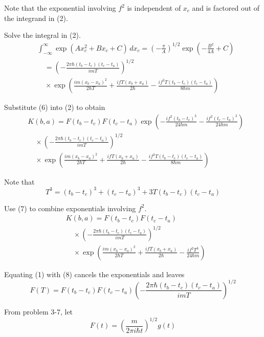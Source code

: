 \documentclass[12pt]{article}
\begin{document}
Note that the exponential involving $f^2$ is independent of $x_c$
and is factored out of the integrand in (2).

\bigskip
Solve the integral in (2).
\begin{align*}
&\int_{-\infty}^{\infty}\exp(Ax_c^2+Bx_c+C)\,dx_c
=\left(-\frac{\pi}{A}\right)^{1/2}
\exp\left(-\frac{B^2}{4A}+C\right)
\\
&\quad{}=\left(-\frac{2\pi\hbar(t_b-t_c)(t_c-t_a)}{imT}\right)^{1/2}
\\
&\quad{}\times\exp\left(
\frac{im(x_b-x_a)^2}{2\hbar T}
+\frac{ifT(x_b+x_a)}{2\hbar}
-\frac{if^2T(t_b-t_c)(t_c-t_a)}{8\hbar m}
\right)
\tag{6}
\end{align*}

Substitute (6) into (2) to obtain
\begin{align*}
&K(b,a)=F(t_b-t_c)F(t_c-t_a)
\exp\left(-\frac{if^2(t_b-t_c)^3}{24\hbar m}-\frac{if^2(t_c-t_a)^3}{24\hbar m}\right)
\\
&\quad{}\times
\left(-\frac{2\pi\hbar(t_b-t_c)(t_c-t_a)}{imT}\right)^{1/2}
\\
&\quad{}\times
\exp\left(
\frac{im(x_b-x_a)^2}{2\hbar T}
+\frac{ifT(x_b+x_a)}{2\hbar}
-\frac{if^2T(t_b-t_c)(t_c-t_a)}{8\hbar m}
\right)
\end{align*}

Note that
\begin{equation*}
T^3=(t_b-t_c)^3+(t_c-t_a)^3+3T(t_b-t_c)(t_c-t_a)
\tag{7}
\end{equation*}

Use (7) to combine exponentials involving $f^2$.
\begin{align*}
&K(b,a)=F(t_b-t_c)F(t_c-t_a)
\\
&\quad{}\times
\left(-\frac{2\pi\hbar(t_b-t_c)(t_c-t_a)}{imT}\right)^{1/2}
\\
&\quad{}\times
\exp\left(
\frac{im(x_b-x_a)^2}{2\hbar T}
+\frac{ifT(x_b+x_a)}{2\hbar}
-\frac{if^2T^3}{24\hbar m}
\right)
\tag{8}
\end{align*}

Equating (1) with (8) cancels the exponentials and leaves
\begin{equation*}
F(T)=F(t_b-t_c)F(t_c-t_a)
\left(-\frac{2\pi\hbar(t_b-t_c)(t_c-t_a)}{imT}\right)^{1/2}
\tag{9}
\end{equation*}

From problem 3-7, let
\begin{equation*}
F(t)=\left(\frac{m}{2\pi i\hbar t}\right)^{1/2} g(t)
\tag{10}
\end{equation*}
\end{document}
